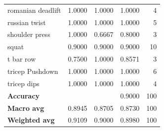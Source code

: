 \begin{table}[!h]
\begin{tabular}{l c c c r}
romanian deadlift         & 1.0000             & 1.0000          & 1.0000            & 4                \\
russian twist             & 1.0000             & 1.0000          & 1.0000            & 5                \\
shoulder press            & 1.0000             & 0.6667          & 0.8000            & 3                \\
squat                     & 0.9000             & 0.9000          & 0.9000            & 10               \\
t bar row                 & 0.7500             & 1.0000          & 0.8571            & 3                \\
tricep Pushdown           & 1.0000             & 1.0000          & 1.0000            & 6                \\
tricep dips               & 1.0000             & 1.0000          & 1.0000            & 4                \\
\hline
\multicolumn{1}{l}{\textbf{Accuracy}}      &                   &           &          0.9000         & 100              \\
\multicolumn{1}{l}{\textbf{Macro avg}}     & 0.8945            & 0.8705          & 0.8730            & 100              \\
\multicolumn{1}{l}{\textbf{Weighted avg}}  & 0.9109            & 0.9000          & 0.8980            & 100              \\
\hline
\end{tabular}
\end{table}